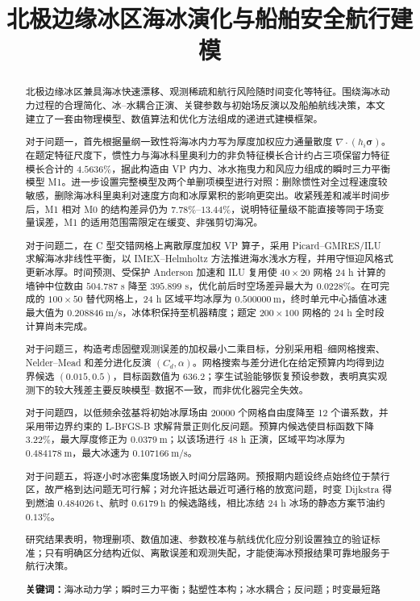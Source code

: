 \documentclass[UTF8]{ctexart}
\title{\textbf{北极边缘冰区海冰演化与船舶安全航行建模}}
\author{}
\date{}
\newcommand{\vect}[1]{\boldsymbol{#1}}
\begin{document}
\setcounter{page}{1}
\maketitle
\vspace{-0.95cm}

\renewcommand{\abstractname}{\sihao 摘\quad 要}
\begin{abstract}\xiaosihao
北极边缘冰区兼具海冰快速漂移、观测稀疏和航行风险随时间变化等特征。围绕海冰动力过程的合理简化、冰--水耦合正演、关键参数与初始场反演以及船舶航线决策，本文建立了一套由物理模型、数值算法和优化方法组成的递进式建模框架。

对于问题一，首先根据量纲一致性将海冰内力写为厚度加权应力通量散度 $\nabla\cdot(h_i\vect\sigma)$。在题定特征尺度下，惯性力与海冰科里奥利力的非负特征模长合计约占三项保留力特征模长合计的 $4.5636\%$，据此构造由 VP 内力、冰水拖曳力和风应力组成的瞬时三力平衡模型 M1。进一步设置完整模型及两个单删项模型进行对照：删除惯性对全过程速度较敏感，删除海冰科里奥利对速度方向和冰厚累积的影响更突出。收紧残差和减半时间步后，M1 相对 M0 的结构差异仍为 $7.78\%$--$13.44\%$，说明特征量级不能直接等同于场变量误差，M1 的适用范围需限定在缓变、非强剪切海况。

对于问题二，在 C 型交错网格上离散厚度加权 VP 算子，采用 Picard--GMRES/ILU 求解海冰非线性平衡，以 IMEX--Helmholtz 方法推进海水浅水方程，并用守恒迎风格式更新冰厚。时间预测、受保护 Anderson 加速和 ILU 复用使 $40\times20$ 网格 24 h 计算的墙钟中位数由 $504.787$ s 降至 $395.899$ s，优化前后时空场差异最大为 $0.0228\%$。在可完成的 $100\times50$ 替代网格上，24 h 区域平均冰厚为 $0.500000\ \mathrm m$，终时单元中心插值冰速最大值为 $0.208846\ \mathrm{m/s}$，冰体积保持至机器精度；题定 $200\times100$ 网格的 24 h 全时段计算尚未完成。

对于问题三，构造考虑固壁观测误差的加权最小二乘目标，分别采用粗--细网格搜索、Nelder--Mead 和差分进化反演 $(C_d,\alpha)$。网格搜索与差分进化在给定预算内均得到边界候选 $(0.015,0.5)$，目标函数值为 $636.2$；孪生试验能够恢复预设参数，表明真实观测下的较大残差主要反映模型--数据不一致，而非优化器完全失效。

对于问题四，以低频余弦基将初始冰厚场由 20000 个网格自由度降至 12 个谱系数，并采用带边界约束的 L-BFGS-B 求解背景正则化反问题。预算内候选使目标函数下降 $3.22\%$，最大厚度修正为 $0.0379\ \mathrm m$；以该场进行 48 h 正演，区域平均冰厚为 $0.484178\ \mathrm m$，最大冰速为 $0.107166\ \mathrm{m/s}$。

对于问题五，将逐小时冰密集度场嵌入时间分层路网。预报期内题设终点始终位于禁行区，故严格到达问题无可行解；对允许抵达最近可通行格的放宽问题，时变 Dijkstra 得到燃油 $0.484026\ \mathrm t$、航时 $0.6179\ \mathrm h$ 的候选路线，相比冻结 24 h 冰场的静态方案节油约 $0.13\%$。

研究结果表明，物理删项、数值加速、参数校准与航线优化应分别设置独立的验证标准；只有明确区分结构近似、离散误差和观测失配，才能使海冰预报结果可靠地服务于航行决策。

\textbf{关键词：}\quad 海冰动力学；瞬时三力平衡；黏塑性本构；冰水耦合；反问题；时变最短路
\end{abstract}
\end{document}
